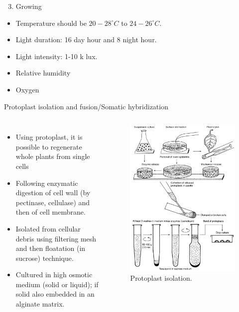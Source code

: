 \documentclass[
  ignorenonframetext,
  aspectratio=169]{beamer}
\providecommand{\tightlist}{%
  \setlength{\itemsep}{0pt}\setlength{\parskip}{0pt}}
\newcommand{\bcolumns}{\begin{columns}[T, onlytextwidth]}
\newcommand{\ecolumns}{\end{columns}}
\begin{document}
\begin{frame}{}
\protect\hypertarget{section-16}{}
\begin{enumerate}
\setcounter{enumi}{2}
\tightlist
\item
  Growing
\end{enumerate}

\begin{itemize}
\tightlist
\item
  Temperature should be \(20-28^\circ C\) to \(24-26^\circ C\).\\
\item
  Light duration: 16 day hour and 8 night hour.
\item
  Light intensity: 1-10 k lux.
\item
  Relative humidity
\item
  Oxygen
\end{itemize}
\end{frame}

\begin{frame}{Protoplast isolation and fusion/Somatic hybridization}
\protect\hypertarget{protoplast-isolation-and-fusionsomatic-hybridization}{}
\bcolumns
{}
\footnotesize

\begin{itemize}
\tightlist
\item
  Using protoplast, it is possible to regenerate whole plants from
  single cells
\item
  Following enzymatic digestion of cell wall (by pectinase, cellulase)
  and then of cell membrane.
\item
  Isolated from cellular debris using filtering mesh and then floatation
  (in sucrose) technique.
\item
  Cultured in high osmotic medium (solid or liquid); if solid also
  embedded in an alginate matrix.
\end{itemize}

\begin{figure}
\includegraphics[width=0.56\linewidth]{../images/protoplast_isolation} \caption{Protoplast isolation.}\label{fig:protoplast-isolation}
\end{figure}

\ecolumns
\end{frame}
\end{document}
